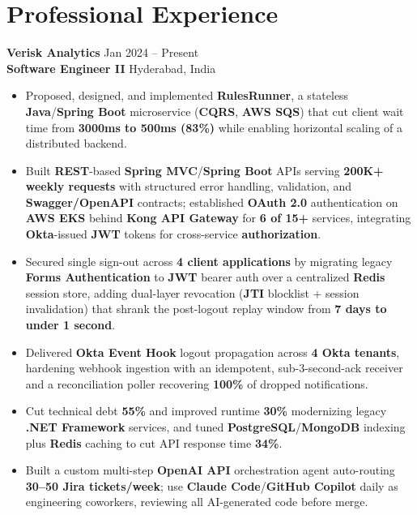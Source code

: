 \documentclass[a4paper,10pt]{article}
\begin{document}
\section*{Professional Experience}

\textbf{Verisk Analytics} \hfill Jan 2024 -- Present \\
\textbf{Software Engineer II} \hfill Hyderabad, India

\begin{itemize}[leftmargin=*]
    \item Proposed, designed, and implemented \textbf{RulesRunner}, a stateless \textbf{Java}/\textbf{Spring Boot} microservice (\textbf{CQRS}, \textbf{AWS SQS}) that cut client wait time from \textbf{3000ms to 500ms (83\%)} while enabling horizontal scaling of a distributed backend.
    \item Built \textbf{REST}-based \textbf{Spring MVC}/\textbf{Spring Boot} APIs serving \textbf{200K+ weekly requests} with structured error handling, validation, and \textbf{Swagger/OpenAPI} contracts; established \textbf{OAuth 2.0} authentication on \textbf{AWS EKS} behind \textbf{Kong API Gateway} for \textbf{6 of 15+} services, integrating \textbf{Okta}-issued \textbf{JWT} tokens for cross-service \textbf{authorization}.
    \item Secured single sign-out across \textbf{4 client applications} by migrating legacy \textbf{Forms Authentication} to \textbf{JWT} bearer auth over a centralized \textbf{Redis} session store, adding dual-layer revocation (\textbf{JTI} blocklist + session invalidation) that shrank the post-logout replay window from \textbf{7 days to under 1 second}.
    \item Delivered \textbf{Okta Event Hook} logout propagation across \textbf{4 Okta tenants}, hardening webhook ingestion with an idempotent, sub-3-second-ack receiver and a reconciliation poller recovering \textbf{100\%} of dropped notifications.
    \item Cut technical debt \textbf{55\%} and improved runtime \textbf{30\%} modernizing legacy \textbf{.NET Framework} services, and tuned \textbf{PostgreSQL}/\textbf{MongoDB} indexing plus \textbf{Redis} caching to cut API response time \textbf{34\%}.
    \item Built a custom multi-step \textbf{OpenAI API} orchestration agent auto-routing \textbf{30--50 Jira tickets/week}; use \textbf{Claude Code}/\textbf{GitHub Copilot} daily as engineering coworkers, reviewing all AI-generated code before merge.
\end{itemize}
\end{document}
